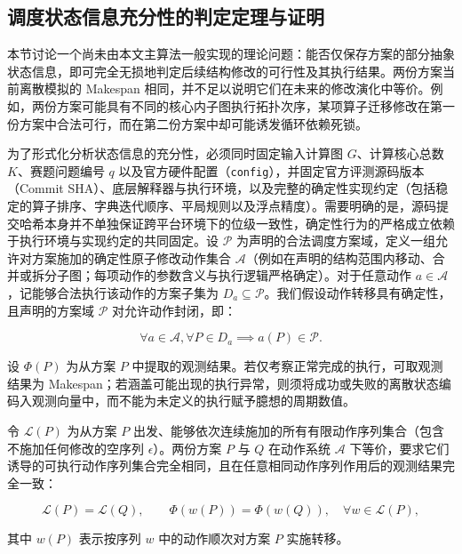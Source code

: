 \documentclass[anonymous,withtoc]{gmcm2026}
\begin{document}
\subsection{调度状态信息充分性的判定定理与证明}

本节讨论一个尚未由本文主算法一般实现的理论问题：能否仅保存方案的部分抽象状态信息，即可完全无损地判定后续结构修改的可行性及其执行结果。两份方案当前离散模拟的 Makespan 相同，并不足以说明它们在未来的修改演化中等价。例如，两份方案可能具有不同的核心内子图执行拓扑次序，某项算子迁移修改在第一份方案中合法可行，而在第二份方案中却可能诱发循环依赖死锁。

为了形式化分析状态信息的充分性，必须同时固定输入计算图 \(G\)、计算核心总数 \(K\)、赛题问题编号 \(q\) 以及官方硬件配置（\texttt{config}），并固定官方评测源码版本（Commit SHA）、底层解释器与执行环境，以及完整的确定性实现约定（包括稳定的算子排序、字典迭代顺序、平局规则以及浮点精度）。需要明确的是，源码提交哈希本身并不单独保证跨平台环境下的位级一致性，确定性行为的严格成立依赖于执行环境与实现约定的共同固定。设 \(\mathcal{P}\) 为声明的合法调度方案域，定义一组允许对方案施加的确定性原子修改动作集合 \(\mathcal{A}\)（例如在声明的结构范围内移动、合并或拆分子图；每项动作的参数含义与执行逻辑严格确定）。对于任意动作 \(a \in \mathcal{A}\)，记能够合法执行该动作的方案子集为 \(D_a \subseteq \mathcal{P}\)。我们假设动作转移具有确定性，且声明的方案域 \(\mathcal{P}\) 对允许动作封闭，即：

\begin{equation}
\forall a \in \mathcal{A}, \forall P \in D_a \implies a(P) \in \mathcal{P}.
\end{equation}

设 \(\Phi(P)\) 为从方案 \(P\) 中提取的观测结果。若仅考察正常完成的执行，可取观测结果为 Makespan；若涵盖可能出现的执行异常，则须将成功或失败的离散状态编码入观测向量中，而不能为未定义的执行赋予臆想的周期数值。

令 \(\mathcal{L}(P)\) 为从方案 \(P\) 出发、能够依次连续施加的所有有限动作序列集合（包含不施加任何修改的空序列 \(\epsilon\)）。两份方案 \(P\) 与 \(Q\) 在动作系统 \(\mathcal{A}\) 下等价，要求它们诱导的可执行动作序列集合完全相同，且在任意相同动作序列作用后的观测结果完全一致：

\begin{equation}
\mathcal{L}(P) = \mathcal{L}(Q), \qquad \Phi(w(P)) = \Phi(w(Q)), \quad \forall w \in \mathcal{L}(P),
\end{equation}

其中 \(w(P)\) 表示按序列 \(w\) 中的动作顺次对方案 \(P\) 实施转移。
\end{document}
